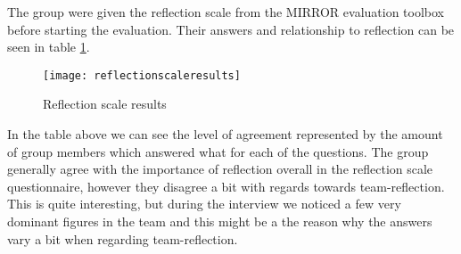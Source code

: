 The group were given the reflection scale from the MIRROR evaluation toolbox before starting the evaluation. Their answers and relationship to reflection can be seen in table \ref{reflectionscaleresults}. 
\begin{figure}[H]
\centering
	\texttt{[image: reflectionscaleresults]}
\caption{Reflection scale results}
\label{reflectionscaleresults}
\end{figure}
In the table above we can see the level of agreement represented by the amount of group members which answered what for each of the questions. The group generally agree with the importance of reflection overall in the reflection scale questionnaire, however they disagree a bit with regards towards team-reflection. This is quite interesting, but during the interview we noticed a few very dominant figures in the team and this might be a the reason why the answers vary a bit when regarding team-reflection.

